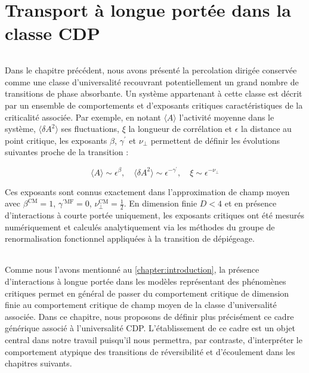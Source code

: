 \chapter{Transport à longue portée dans la classe CDP}

\label{chapter:TransportLP}

\subparagraph{}Dans le chapitre précédent, nous avons présenté la percolation dirigée conservée comme une classe d'universalité recouvrant potentiellement un grand nombre de transitions de phase absorbante. Un système appartenant à cette classe est décrit par un ensemble de comportements et d'exposants critiques caractéristiques de la criticalité associée. Par exemple, en notant $\langle A \rangle$ l'activité moyenne dans le système, $\langle \delta A^2 \rangle$ ses fluctuations, $\xi$ la longueur de corrélation et $\epsilon$ la distance au point critique, les exposants $\beta$, $\gamma^\prime$ et $\nu_\perp$ permettent de définir les évolutions suivantes proche de la transition :

\begin{equation}
	\langle A \rangle \sim \epsilon^\beta, \quad \langle \delta A^2 \rangle \sim \epsilon^{-\gamma^\prime}, \quad \xi \sim \epsilon^{-\nu_\perp}
\end{equation}

\noindent Ces exposants sont connus exactement dans l'approximation de champ moyen avec $\beta^\text{CM} = 1$, $\gamma^{\prime\text{MF}} = 0$, $\nu_\perp^\text{CM} = \frac{1}{2}$. En dimension finie $D<4$ et en présence d'interactions à courte portée uniquement, les exposants critiques ont été mesurés numériquement \cite{lubeck_universal_2004} et calculés analytiquement via les méthodes du groupe de renormalisation fonctionnel appliquées à la transition de dépiégeage.

\subparagraph{}Comme nous l'avons mentionné au \autoref{chapter:introduction}, la présence d'interactions à longue portée dans les modèles représentant des phénomènes critiques permet en général de passer du comportement critique de dimension finie au comportement critique de champ moyen de la classe d'universalité associée. Dans ce chapitre, nous proposons de définir plus précisément ce cadre générique associé à l'universalité CDP. L'établissement de ce cadre est un objet central dans notre travail puisqu'il nous permettra, par contraste, d'interpréter le comportement atypique des transitions de réversibilité et d'écoulement dans les chapitres suivants.

